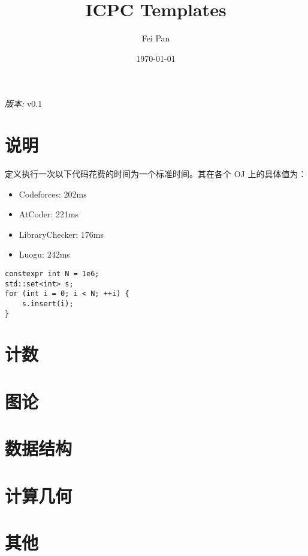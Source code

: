 \documentclass[12pt]{ctexart}
\title{ICPC Templates}
\date{\today}
\author{Fei Pan}
\newcommand{\version}{v0.1}
\begin{document}
\maketitle
\begin{center}
    \textit{版本: }\version
\end{center}

\tableofcontents
\newpage

\section{说明}

定义执行一次以下代码花费的时间为一个标准时间。其在各个 OJ 上的具体值为：

\begin{itemize}
\item Codeforces: 202ms
\item AtCoder: 221ms
\item LibraryChecker: 176ms
\item Luogu: 242ms
\end{itemize}
\begin{lstlisting}
constexpr int N = 1e6;
std::set<int> s;
for (int i = 0; i < N; ++i) {
    s.insert(i);
}
\end{lstlisting}
\newpage

\section{计数}



\section{图论}



\section{数据结构}


\section{计算几何}


\section{其他}


\end{document}
